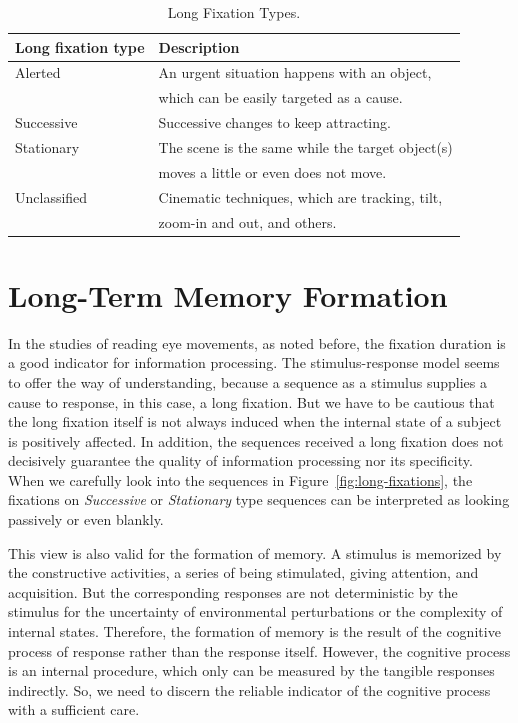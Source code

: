 \documentclass[oneside,master]{snueethesis}
\begin{document}
\begin{table}[htbp]
\begin{center} 
\caption{Long Fixation Types.} 
\label{tab:long-fixation-types} 
\vskip 0.12in
\begin{tabular}{lp{8cm}} 
\hline
Long fixation type    &  Description \\
\hline
Alerted         &   An urgent situation happens with an object, \\
                &   \hspace{5mm} which can be easily targeted as a cause.\\
Successive      &   Successive changes to keep attracting. \\
Stationary      &   The scene is the same while the target object(s) \\
                &   \hspace{5mm} moves a little or even does not move. \\
Unclassified    &   Cinematic techniques, which are tracking, tilt, \\
                &   \hspace{5mm} zoom-in and out, and others. \\
\hline
\end{tabular} 
\end{center} 
\end{table}



\chapter{Long-Term Memory Formation}

In the studies of reading eye movements, as noted before, the fixation duration is a good indicator for information processing. The stimulus-response model seems to offer the way of understanding, because a sequence as a stimulus supplies a cause to response, in this case, a long fixation. But we have to be cautious that the long fixation itself is not always induced when the internal state of a subject is positively affected. In addition, the sequences received a long fixation does not decisively guarantee the quality of information processing nor its specificity. When we carefully look into the sequences in Figure~\ref{fig:long-fixations}, the fixations on \textit{Successive} or \textit{Stationary} type sequences can be interpreted as looking passively or even blankly.

This view is also valid for the formation of memory. A stimulus is memorized by the constructive activities, a series of being stimulated, giving attention, and acquisition. But the corresponding responses are not deterministic by the stimulus for the uncertainty of environmental perturbations or the complexity of internal states. Therefore, the formation of memory is the result of the cognitive process of response rather than the response itself. However, the cognitive process is an internal procedure, which only can be measured by the tangible responses indirectly. So, we need to discern the reliable indicator of the cognitive process with a sufficient care.
\end{document}
